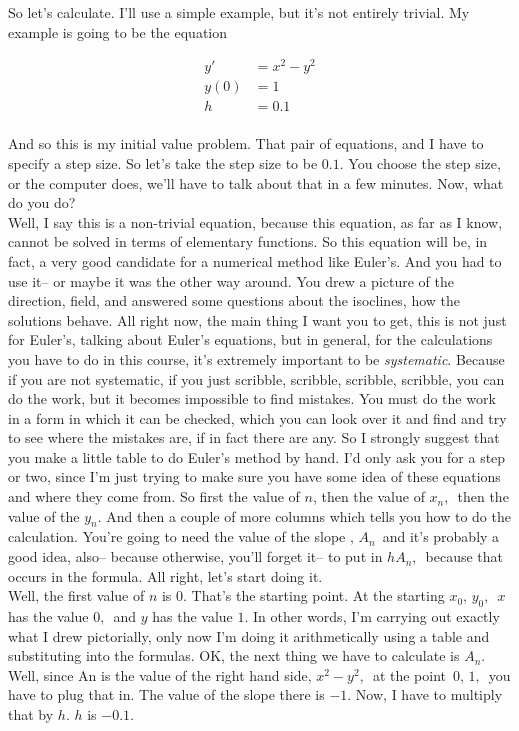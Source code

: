 So let's calculate.
I'll use a simple example, but it's not entirely trivial.
My example is going to be the equation

\begin{align*}
  y' &= x^2 - y^2 \\
  y(0) &= 1 \\
  h &= 0.1 \\ 
\end{align*}

And so this is my initial value problem.
That pair of equations, and I have to specify a step size.
So let's take the step size to be $0.1$.
You choose the step size, or the computer does,
we'll have to talk about that in a few minutes.
Now, what do you do?\\
Well, I say this is a non-trivial equation,
because this equation, as far as I know,
cannot be solved in terms of elementary functions.
So this equation will be, in fact, a very good candidate for a numerical method like Euler's.
And you had to use it-- or maybe it was the other way around.
You drew a picture of the direction, field,
and answered some questions about the isoclines, how the solutions behave.
All right now, the main thing I want you to get,
this is not just for Euler's, talking about Euler's equations, but in general,
for the calculations you have to do in this course,
it's extremely important to be \emph{systematic}.
Because if you are not systematic,
if you just scribble, scribble, scribble, scribble,
you can do the work, but it becomes impossible to find mistakes.
You must do the work in a form in which it
can be checked, which you can look over it and find and try
to see where the mistakes are, if in fact there are any.
So I strongly suggest that you make a little table to do Euler's method by hand.
I'd only ask you for a step or two,
since I'm just trying to make sure you have some idea of these equations
and where they come from.
So first the value of $n$, then the value of $x_n,\,$
then the value of the $y_n$.
And then a couple of more columns which tells you how to do the calculation.
You're going to need the value of the slope $,\, A_n \,$
and it's probably a good idea, also--
because otherwise, you'll forget it--
to put in $h A_n,\,$ because that occurs in the formula.
All right, let's start doing it. \\

Well, the first value of $n$ is $0$.
That's the starting point.
At the starting $x_0,\,  y_0,\,$  $x$ has the value $0,\,$
and $y$ has the value $1$.
In other words, I'm carrying out exactly what
I drew pictorially, only now I'm doing it arithmetically using
a table and substituting into the formulas.
OK, the next thing we have to calculate is $A_n$.
Well, since An is the value of the right hand
side$,\, x^2 - y^2, \,$ at the point $\, 0, \, 1,\,$ you have to plug that in.
The value of the slope there is $-1$.
Now, I have to multiply that by $h$.
$h$ is $-0.1$. 

